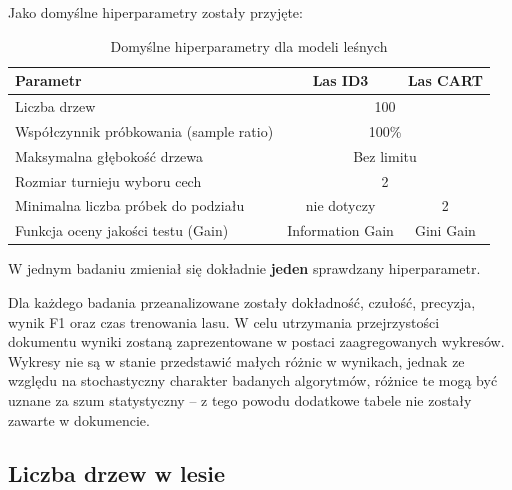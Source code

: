 \documentclass[a4paper]{article}
\begin{document}
Jako domyślne hiperparametry zostały przyjęte:
\begin{table}[h!]
\centering
\caption{Domyślne hiperparametry dla modeli leśnych}
\label{tab:parametry-domyslne}
\begin{tabular}{|l|c|c|}
\hline
\textbf{Parametr} & \textbf{Las ID3} & \textbf{Las CART} \\ \hline
Liczba drzew & \multicolumn{2}{c|}{100} \\ \hline
Współczynnik próbkowania (sample ratio) & \multicolumn{2}{c|}{100\%} \\ \hline
Maksymalna głębokość drzewa & \multicolumn{2}{c|}{Bez limitu} \\ \hline
Rozmiar turnieju wyboru cech & \multicolumn{2}{c|}{2} \\ \hline
Minimalna liczba próbek do podziału & nie dotyczy & 2 \\ \hline
Funkcja oceny jakości testu (Gain) & Information Gain & Gini Gain \\ \hline
\end{tabular}
\end{table}



W jednym badaniu zmieniał się dokładnie \textbf{jeden} sprawdzany hiperparametr.

Dla każdego badania przeanalizowane zostały dokładność, czułość, precyzja, wynik F1 oraz czas trenowania lasu.
W celu utrzymania przejrzystości dokumentu wyniki zostaną zaprezentowane w postaci zaagregowanych wykresów.
Wykresy nie są w stanie przedstawić małych różnic w wynikach, jednak ze względu na stochastyczny charakter badanych algorytmów,
różnice te mogą być uznane za szum statystyczny -- z tego powodu dodatkowe tabele nie zostały zawarte w dokumencie.

\subsection{Liczba drzew w lesie}
\end{document}
